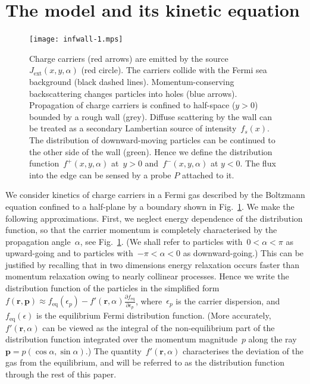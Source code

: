 \documentclass[preprint,aps,eqsecnum, prb]{revtex4-1}
\newcommand{\fplus}[1]{{#1}^{+}}
\newcommand{\fminus}[1]{{#1}^{-}}
\begin{document}
\section{The model and its kinetic equation}
\label{sec:boltzmann}
\begin{figure}
   \texttt{[image: infwall-1.mps]}
  \caption{
  \label{fig:setup}
  Charge carriers (red arrows) are emitted by the
  source~$J_\mathrm{ext}(x, y, \alpha)$ (red circle). The carriers collide with
  the Fermi sea  background (black dashed lines). Momentum-conserving backscattering
  changes particles into holes (blue arrows). Propagation of charge carriers
  is confined to half-space ($y > 0$) bounded by a rough wall (grey).
  Diffuse scattering by the wall can be treated as a secondary
  Lambertian source of intensity~$f_s(x)$. The distribution of downward-moving
  particles can be continued to the other side of the wall (green).
  Hence we define  the distribution function~$\fplus{f}(x, y, \alpha)$
  at~$y > 0$ and~$\fminus{f}(x, y, \alpha)$ at $y < 0$. The flux into
  the edge can be sensed by a probe $P$ attached to it.
}
\end{figure}
We consider kinetics of charge carriers in a Fermi gas
described by the Boltzmann equation
confined to a half-plane by a boundary shown in Fig.~\ref{fig:setup}.
We make the following approximations. First, we neglect
energy dependence of the distribution function, so that the carrier momentum
is completely characterised by the propagation angle~$\alpha$, see
Fig.~\ref{fig:setup}. (We shall refer to particles with~$0 < \alpha < \pi$
as upward-going and to particles with~$-\pi < \alpha < 0$ as downward-going.)
This can be justified by recalling that in two dimensions
energy relaxation occurs faster than momentum
relaxation\cite{bib:momentum-relaxation} owing to nearly collinear processes.
Hence  we write the distribution function
of the particles in the simplified form~$f({\bm r}, {\bm p})
\approx f_{\mathrm{eq}}(\epsilon_p)
- f' ({\bm r}, \alpha) \frac{\partial f_{\mathrm{eq}}}{\partial \epsilon_p}$,
where~$\epsilon_p$ is the carrier dispersion, and~$f_\mathrm{eq}(\epsilon)$
is the equilibrium Fermi distribution function.
(More accurately, $f'({\bm r}, \alpha)$ can be viewed as the integral
of the non-equilibrium part of the distribution function integrated
over the momentum magnitude~$p$ along
the ray~${\bm p} = p (\cos\alpha, \sin\alpha)$.)
The quantity~$f'({\bm r}, \alpha)$ characterises the deviation of the gas
from the equilibrium, and will be referred to as the distribution
function through the rest of this paper.
\end{document}
